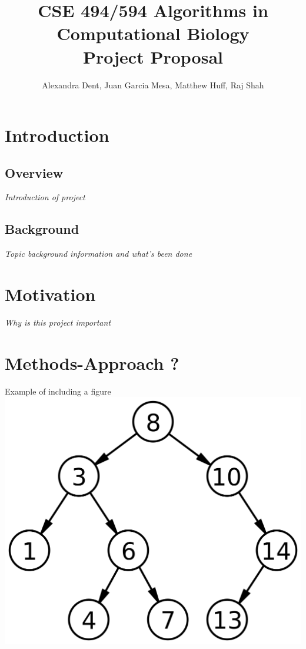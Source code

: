 \documentclass[12pt]{article}
\title{CSE 494/594 Algorithms in Computational Biology \\
		Project Proposal}
\author{Alexandra Dent, Juan Garcia Mesa, Matthew Huff, Raj Shah}
\begin{document}
\maketitle

\section{Introduction}
\subsection{Overview}
\textit{Introduction of project}

\subsection{Background}
\textit{Topic background information and what's been done}

\section{Motivation}
\textit{Why is this project important}


\section{Methods-Approach ?}

Example of including a figure \\
\includegraphics[scale=0.2]{binary_search_tree.png}
\end{document}
